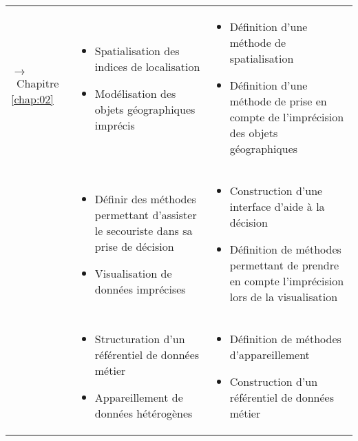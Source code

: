 \begin{tabular}{L{.2\textheight}L{.35\textheight}L{.35\textheight}}
  {\par\footnotesize\hspace{.25cm}$\longrightarrow$~Chapitre \ref{chap:02}}
& \begin{minipage}{.35\textheight}
    \begin{itemize}
    \item Spatialisation des indices de localisation
    \item Modélisation des objets géographiques imprécis
    \end{itemize}
  \end{minipage}& \begin{minipage}{.35\textheight}
    \begin{itemize}
    \item Définition d'une méthode de spatialisation
    \item Définition d'une méthode de prise en compte de l'imprécision
      des objets géographiques
    \end{itemize}
  \end{minipage} \\
& \begin{minipage}{.35\textheight}
    \begin{itemize}
    \item Définir des méthodes permettant d'assister le secouriste
      dans sa prise de décision
    \item Visualisation de données imprécises
    \end{itemize}
  \end{minipage}& \begin{minipage}{.35\textheight}
    \begin{itemize}
    \item Construction d'une interface d'aide à la décision
    \item Définition de méthodes permettant de prendre en compte
      l'imprécision lors de la visualisation
    \end{itemize}
  \end{minipage} \\
& \begin{minipage}{.35\textheight}
    \begin{itemize}
    \item Structuration d'un référentiel de données métier
    \item Appareillement de données hétérogènes
    \end{itemize}
  \end{minipage}& \begin{minipage}{.35\textheight}
    \begin{itemize}
    \item Définition de méthodes d'appareillement
    \item Construction d'un référentiel de données métier
    \end{itemize}
  \end{minipage}\\
  
  \bottomrule
\end{tabular}
